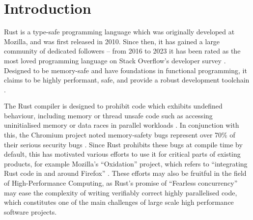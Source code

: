 \chapter{Introduction}
\label{ch:introduction} %

Rust is a type-safe programming language which was originally developed at Mozilla, and was first released in 2010. Since then, it has gained a large community of dedicated followers -- from 2016 to 2023 it has been rated as the most loved programming language on Stack Overflow's developer survey \cite{StackOverflowDeveloper}. Designed to be memory-safe and have foundations in functional programming, it claims to be highly performant, safe, and provide a robust development toolchain \cite{RustProgrammingLanguage}.

The Rust compiler is designed to prohibit code which exhibits undefined behaviour, including memory or thread unsafe code such as accessing uninitialised memory or data races in parallel workloads \cite{BehaviorConsideredUndefined}. In conjunction with this, the Chromium project noted memory-safety bugs represent over 70\% of their serious security bugs \cite{MemorySafety}. Since Rust prohibits these bugs at compile time by default, this has motivated various efforts to use it for critical parts of existing products, for example Mozilla's ``Oxidation'' project, which refers to ``integrating Rust code in and around Firefox'' \cite{OxidationMozillaWiki}. These efforts may also be fruitful in the field of High-Performance Computing, as Rust's promise of ``Fearless concurrency'' \cite{klabnikFearlessConcurrency2018} may ease the complexity of writing verifiably correct highly parallelised code, which constitutes one of the main challenges of large scale high performance software projects.

